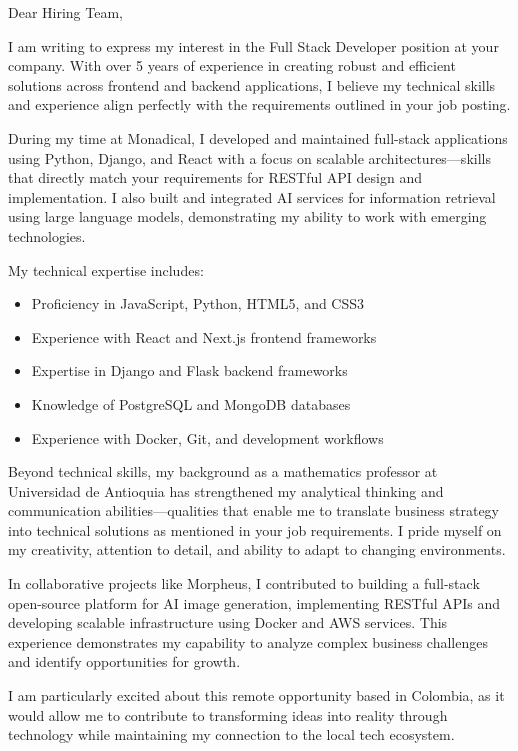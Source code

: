 \documentclass[11pt]{letter}
\begin{document}
\begin{letter}{}
\opening{Dear Hiring Team,}

I am writing to express my interest in the Full Stack Developer position at your company. With over 5 years of experience in creating robust and efficient solutions across frontend and backend applications, I believe my technical skills and experience align perfectly with the requirements outlined in your job posting.

During my time at Monadical, I developed and maintained full-stack applications using Python, Django, and React with a focus on scalable architectures—skills that directly match your requirements for RESTful API design and implementation. I also built and integrated AI services for information retrieval using large language models, demonstrating my ability to work with emerging technologies.

My technical expertise includes:
\begin{itemize}
\item Proficiency in JavaScript, Python, HTML5, and CSS3
\item Experience with React and Next.js frontend frameworks
\item Expertise in Django and Flask backend frameworks 
\item Knowledge of PostgreSQL and MongoDB databases
\item Experience with Docker, Git, and development workflows
\end{itemize}

Beyond technical skills, my background as a mathematics professor at Universidad de Antioquia has strengthened my analytical thinking and communication abilities—qualities that enable me to translate business strategy into technical solutions as mentioned in your job requirements. I pride myself on my creativity, attention to detail, and ability to adapt to changing environments.

In collaborative projects like Morpheus, I contributed to building a full-stack open-source platform for AI image generation, implementing RESTful APIs and developing scalable infrastructure using Docker and AWS services. This experience demonstrates my capability to analyze complex business challenges and identify opportunities for growth.

I am particularly excited about this remote opportunity based in Colombia, as it would allow me to contribute to transforming ideas into reality through technology while maintaining my connection to the local tech ecosystem.


\end{letter}
\end{document}
